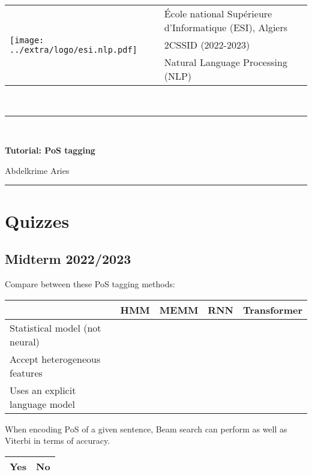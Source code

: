 \documentclass[11pt, a4paper]{article}
\begin{document}
	
	
	\noindent
	\begin{tabular}{ll}
		\multirow{3}{*}{\texttt{[image: ../extra/logo/esi.nlp.pdf]}} & 
		\'Ecole national Supérieure d'Informatique (ESI), Algiers\\
		& 2CSSID (2022-2023)\\
		& Natural Language Processing (NLP)
	\end{tabular}\\[.25cm]
	\noindent\rule{\textwidth}{2pt}\\[-0.5cm]
	\begin{center}
		{\LARGE \textbf{Tutorial: PoS tagging}}
		\begin{flushright}
			Abdelkrime Aries
		\end{flushright}
	\end{center}\vspace{-0.5cm}
	\noindent\rule{\textwidth}{2pt}


\section{Quizzes}

\subsection{Midterm 2022/2023}

Compare between these PoS tagging methods:
\begin{center}
	\begin{tabular}{|l|l|l|l|l|}
		\cline{2-5}
		\multicolumn{1}{l|}{}
		& HMM & MEMM & RNN & Transformer \\
		\hline
		Statistical model (not neural) & \Square & \Square & \Square & \Square \\ \hline
		Accept heterogeneous features & \Square & \Square & \Square & \Square \\ \hline
		Uses an explicit language model & \Square & \Square & \Square & \Square \\
		\hline
	\end{tabular}
\end{center}

When encoding PoS of a given sentence, Beam search can perform as well as Viterbi in terms of accuracy.
\begin{center}
	\begin{tabular}{|ll|}
		\hline
		\Circle Yes & \Circle No \\
		\hline
	\end{tabular}
\end{center}
\end{document}
